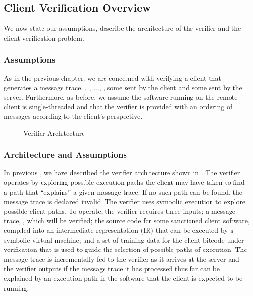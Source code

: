 \subsection{Client Verification Overview}
\label{sec:par:overview}

We now state our assumptions, describe the architecture of the verifier
and the client verification problem.

\subsubsection{Assumptions}
As in the previous chapter,
we are concerned with verifying a client that generates a message
trace, , , $\ldots$, \msg{\msgNmbr}, some sent by the
client and some sent by the server. Furthermore, as before, we assume
the software running on the remote client is single-threaded and that
the verifier is provided with an ordering of messages according to the
client's perspective.

\begin{figure}[t]
\centering
{}
\caption{Verifier Architecture\label{fig:parallel:verifier:arch}}
\end{figure}

\subsubsection{Architecture and Assumptions}
In previous \papers, we have described the verifier architecture shown
in . The verifier operates by
exploring possible execution paths the client may have taken to find a
path that ``explains'' a given message trace. If no such path can be
found, the message trace is declared invalid. The verifier uses
symbolic execution to explore possible client paths. To operate, the
verifier requires three inputs; a message trace, \msgTrace, which will
be verified; the source code for some sanctioned client software,
compiled into an intermediate representation (IR) that can be executed
by a symbolic virtual machine; and a set of training data for
the client bitcode under verification that is used to guide the
selection of possible paths of execution. The message trace is
incrementally fed to the verifier as it arrives at the server and
the verifier outputs if the message trace it has processed thus far can be
explained by an execution path in the software that the client is
expected to be running. 


